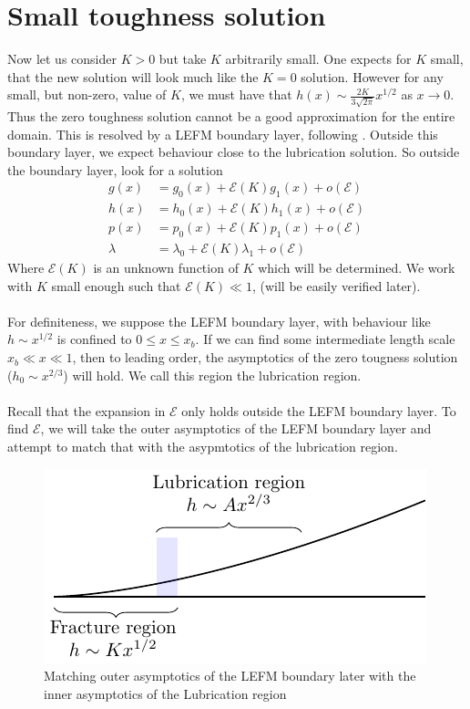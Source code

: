 \documentclass{article}
\newcommand{\cE}{\mathcal{E}}                               %
\begin{document}
\section{Small toughness solution}
Now let us consider $K>0$ but take $K$ arbitrarily small. One expects for 
$K$ small, that the new solution will look much like the $K=0$ solution.
However for any small, but non-zero, value of $K$, we must have that
$h(x) \sim \frac{2K}{3\sqrt{2\pi}}x^{1/2}$ as $x\to0$. Thus the zero toughness
solution cannot be a good approximation for the entire domain. This is 
resolved by a LEFM boundary layer, following \cite{GandD}.
Outside this boundary layer, we expect behaviour close to the lubrication 
solution. So outside the boundary layer, look for a solution
\begin{align*}
g(x) &= g_0(x) + \cE(K)g_1(x)+o(\cE) \\
h(x) &= h_0(x) + \cE(K)h_1(x)+o(\cE) \\
p(x) &= p_0(x) + \cE(K)p_1(x)+o(\cE) \\
\lambda &= \lambda_0 + \cE(K)\lambda_1+o(\cE) 
\end{align*}
Where $\cE(K)$ is an unknown function of $K$ which will be determined.
We work with $K$ small enough such that $\cE(K) \ll 1$, (will be easily
verified later).
\\
\\
For definiteness, we suppose the LEFM boundary layer, with behaviour like
$h \sim x^{1/2}$ is confined to $0 \leq x \leq x_b $. If we can find some
intermediate length scale $x_b \ll x \ll 1$, then to leading order, the
asymptotics of the zero tougness solution ($h_0 \sim x^{2/3}$) will hold.
We call this region the lubrication region.
\\
\\
Recall that the expansion in $\cE$ only holds outside the LEFM boundary
layer. To find $\cE$, we will take the outer asymptotics of the LEFM boundary
layer and attempt to match that with the asypmtotics of the lubrication region. 

\begin{figure}[!ht]\centering
\caption{Matching outer asymptotics of the LEFM boundary later with the inner
asymptotics of the Lubrication region}
\includegraphics{Fig6.pdf}
\end{figure}
\end{document}
